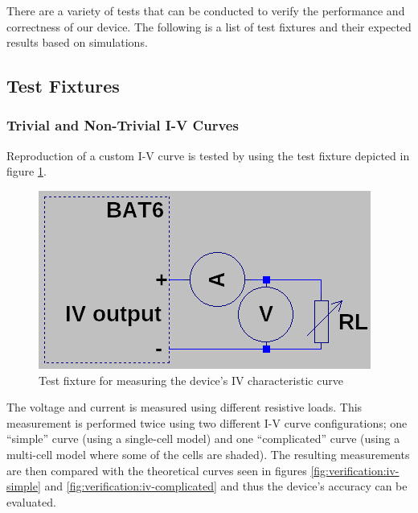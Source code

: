 There are a variety of tests that can be conducted to verify the performance and
correctness of our  device.  The  following is a list of test fixtures and their
expected results based on simulations.

\subsection{Test Fixtures}

\subsubsection{Trivial and Non-Trivial I-V Curves}

Reproduction of a custom I-V  curve is tested by using the test fixture depicted
in figure \ref{fig:verification:iv-circuit-fix}.

\begin{figure}[th!]
    \centering
    \includegraphics[width=.4\textwidth]{images/sim/iv-curve-circuit.png}
    \caption{Test fixture for measuring the device's IV characteristic curve}
    \label{fig:verification:iv-circuit-fix}
\end{figure}

The  voltage  and  current  is  measured  using  different resistive loads. This
measurement is performed twice using two different I-V curve configurations; one
``simple''  curve (using a single-cell  model)  and  one  ``complicated''  curve
(using a  multi-cell  model  where  some of the cells are shaded). The resulting
measurements are then compared with  the  theoretical  curves  seen  in  figures
\ref{fig:verification:iv-simple}  and  \ref{fig:verification:iv-complicated} and
thus the device's accuracy can be evaluated.

